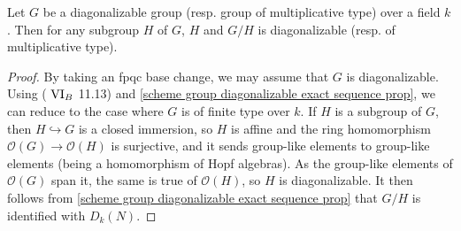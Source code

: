 \begin{proposition}\label{scheme k-group multiplicative quotient subgroup is multiplicative}
Let $G$ be a diagonalizable group (resp. group of multiplicative type) over a field $k$. Then for any subgroup $H$ of $G$, $H$ and $G/H$ is diagonalizable (resp. of multiplicative type).
\end{proposition}
\begin{proof}
By taking an fpqc base change, we may assume that $G$ is diagonalizable. Using (\cite{SGA3-1} $\Rmnum{6}_B$ 11.13) and \cref{scheme group diagonalizable exact sequence prop}, we can reduce to the case where $G$ is of finite type over $k$. If $H$ is a subgroup of $G$, then $H\hookrightarrow G$ is a closed immersion, so $H$ is affine and the ring homomorphism $\mathscr{O}(G)\to\mathscr{O}(H)$ is surjective, and it sends group-like elements to group-like elements (being a homomorphism of Hopf algebras). As the group-like elements of $\mathscr{O}(G)$ span it, the same is true of $\mathscr{O}(H)$, so $H$ is diagonalizable. It then follows from \cref{scheme group diagonalizable exact sequence prop} that $G/H$ is identified with $D_k(N)$. 
\end{proof}

